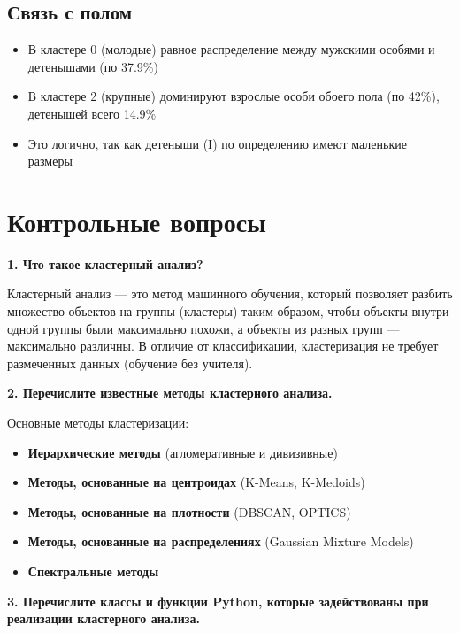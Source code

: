 \subsection{Связь с полом}

\begin{itemize}
    \item В кластере 0 (молодые) равное распределение между мужскими особями и детенышами (по 37.9\%)
    \item В кластере 2 (крупные) доминируют взрослые особи обоего пола (по 42\%), детенышей всего 14.9\%
    \item Это логично, так как детеныши (I) по определению имеют маленькие размеры
\end{itemize}

\section{Контрольные вопросы}

\textbf{1. Что такое кластерный анализ?}

Кластерный анализ — это метод машинного обучения, который позволяет разбить множество объектов на группы (кластеры) таким образом, чтобы объекты внутри одной группы были максимально похожи, а объекты из разных групп — максимально различны. В отличие от классификации, кластеризация не требует размеченных данных (обучение без учителя).

\textbf{2. Перечислите известные методы кластерного анализа.}

Основные методы кластеризации:
\begin{itemize}
    \item \textbf{Иерархические методы} (агломеративные и дивизивные)
    \item \textbf{Методы, основанные на центроидах} (K-Means, K-Medoids)
    \item \textbf{Методы, основанные на плотности} (DBSCAN, OPTICS)
    \item \textbf{Методы, основанные на распределениях} (Gaussian Mixture Models)
    \item \textbf{Спектральные методы}
\end{itemize}

\textbf{3. Перечислите классы и функции Python, которые задействованы при реализации кластерного анализа.}

